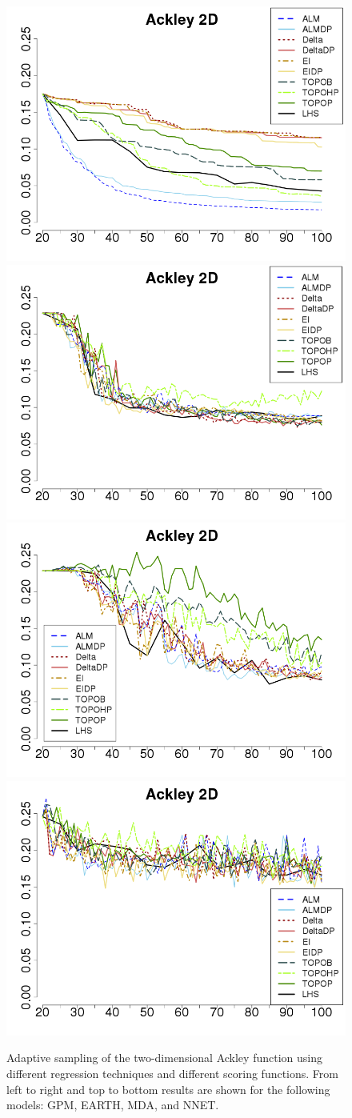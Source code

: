 \begin{figure}[b]
\begin{center}
\includegraphics[width=0.45\linewidth]{figs/chap5/gpm_Ackley_td=20}
\includegraphics[width=0.45\linewidth]{figs/chap5/earth_Ackley_td=20}
\includegraphics[width=0.45\linewidth]{figs/chap5/mda_Ackley_td=20}
\includegraphics[width=0.45\linewidth]{figs/chap5/nnet_Ackley_td=20}
\caption[Comparison of RMSE using four prediction models]{Adaptive sampling of the two-dimensional Ackley function using different regression techniques and different scoring functions. From left to right and top to bottom results are shown for the following models: GPM, EARTH, MDA, and NNET.}
\label{fig:ackley2D_results}
\end{center}
\end{figure}

